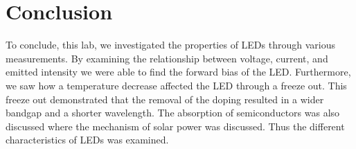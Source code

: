 \section{Conclusion}
To conclude, this lab, we investigated the properties of LEDs through various measurements. By examining the relationship between voltage, current, and emitted intensity we were able to find the forward bias of the LED. Furthermore, we saw how a temperature decrease affected the LED through a freeze out. This freeze out demonstrated that the removal of the doping resulted in a wider bandgap and a shorter wavelength. The absorption of semiconductors was also discussed where the mechanism of solar power was discussed. Thus the different characteristics of LEDs was examined. 


